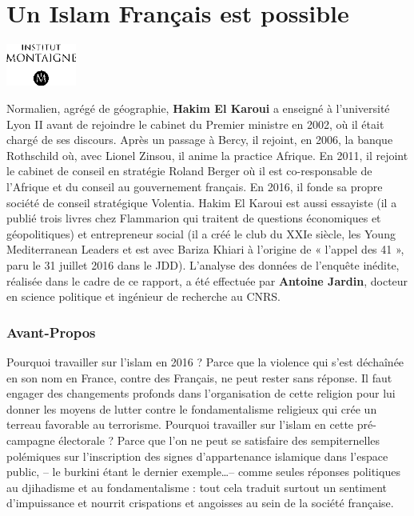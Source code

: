 \chapter{Un Islam Français est possible}

\begin{marginfigure}
\centering
\includegraphics[width=0.91222in,height=0.54469in]{ImageIslamFrance/media/image6.png}
\caption{
Normalien, agrégé de géographie, \textbf{Hakim El Karoui} a enseigné à
l'université Lyon II avant de rejoindre le cabinet du Premier ministre
en 2002, où il était chargé de ses discours. Après un passage à Bercy,
il rejoint, en 2006, la banque Rothschild où, avec Lionel Zinsou, il
anime la practice Afrique. En 2011, il rejoint le cabinet de conseil en
stratégie Roland Berger où il est co-responsable de l'Afrique et du
conseil au gouvernement français. En 2016, il fonde sa propre société de
conseil stratégique Volentia. Hakim El Karoui est aussi essayiste (il a
publié trois livres chez Flammarion qui traitent de questions
économiques et géopolitiques) et entrepreneur social (il a créé le club
du XXIe siècle, les Young Mediterranean Leaders et est avec Bariza
Khiari à l'origine de « l'appel des 41 », paru le 31 juillet 2016 dans
le JDD). L'analyse des données de l'enquête inédite, réalisée dans le cadre de ce
rapport, a été effectuée par \textbf{Antoine Jardin}, docteur en science
politique et ingénieur de recherche au CNRS.}
\end{marginfigure}



\subsection{Avant-Propos}


Pourquoi travailler sur l'islam en 2016 ? Parce que la violence qui
s'est déchaînée en son nom en France, contre des Français, ne peut
rester sans réponse. Il faut engager des changements profonds dans
l'organisation de cette religion pour lui donner les moyens de lutter
contre le fondamentalisme religieux qui crée un terreau favorable au
terrorisme. Pourquoi travailler sur l'islam en cette pré-campagne
électorale ? Parce que l'on ne peut se satisfaire des sempiternelles
polémiques sur l'inscription des signes d'appartenance islamique dans
l'espace public, -- le burkini étant le dernier exemple\ldots-- comme
seules réponses politiques au djihadisme et au fondamentalisme : tout
cela traduit surtout un sentiment d'impuissance et nourrit crispations
et angoisses au sein de la société française.

